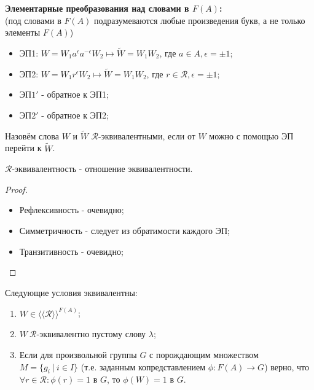 \textbf{Элементарные преобразования над словами в $F(A)$:}\\
(под словами в $F(A)$ подразумеваются любые произведения букв, а не только элементы $F(A)$)
\begin{itemize}
    \item ЭП1: $W = W_1a^\epsilon a^{-\epsilon}W_2 \mapsto \tilde{W} = W_1W_2$, где $a \in A, \epsilon = \pm 1$;
    \item ЭП2: $W = W_1r^\epsilon W_2 \mapsto \tilde{W} = W_1W_2$, где $r \in \mathcal{R}, \epsilon = \pm 1$;
    \item ЭП$1'$ - обратное к ЭП1;
    \item ЭП$2'$ - обратное к ЭП2;
\end{itemize}
\begin{definition}
    Назовём слова $W$ и $\tilde{W}$ $\mathcal{R}$-эквивалентными, если от $W$ можно с помощью ЭП перейти к $\tilde{W}$.
\end{definition}
\begin{subtheorem}
    $\mathcal{R}$-эквивалентность - отношение эквивалентности.
\end{subtheorem}
\begin{proof}\tab
    \begin{itemize}
        \item Рефлексивность - очевидно;
        \item Симметричность - следует из обратимости каждого ЭП;
        \item Транзитивность - очевидно; 
    \end{itemize}
\end{proof}
\begin{theoremnum}
    Следующие условия эквивалентны:
    \begin{enumerate}
        \item $W \in \langle \langle \mathcal{R} \rangle \rangle^{F(A)}$;
        \item $W \ \mathcal{R}$-эквивалентно пустому слову $\lambda$;
        \item Если для произвольной группы $G$ с порождающим множеством $M = \{g_i \ | \ i \in I\}$ (т.е. заданным копредставлением $\phi: F(A) \rightarrow G$) верно, что $\forall r \in \mathcal{R}: \phi(r) = 1$ в $G$, то $\phi(W) = 1$ в $G$.
    \end{enumerate}
\end{theoremnum}
